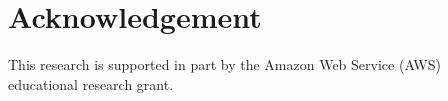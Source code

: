 \section{Acknowledgement}
This research is supported in part by the Amazon Web Service (AWS) educational research grant.
